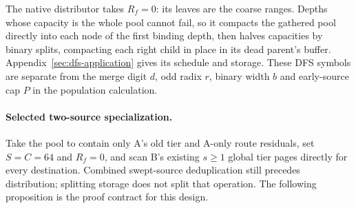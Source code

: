 \documentclass[11pt]{article}
\theoremstyle{definition}
\theoremstyle{remark}
\begin{document}
The native distributor takes $R_f=0$: its leaves are the coarse ranges.
Depths whose capacity is the whole pool cannot fail, so it compacts the
gathered pool directly into each node of the first binding depth, then
halves capacities by binary splits, compacting each right child in place in
its dead parent's buffer. Appendix~\ref{sec:dfs-application} gives its
schedule and storage. These DFS symbols are separate from the merge digit
$d$, odd radix $r$, binary width $b$ and early-source cap $P$ in the
population calculation.

\paragraph{Selected two-source specialization.}
Take the pool to contain only A's old tier and A-only route residuals, set
$S=C=64$ and $R_f=0$, and scan B's existing $s\ge1$ global tier pages
directly for every destination. Combined swept-source deduplication still
precedes distribution; splitting storage does not split that operation.
The following proposition is the proof contract for this design.
\end{document}
